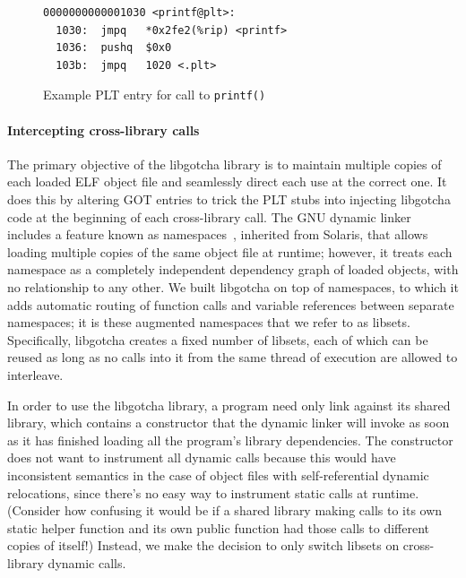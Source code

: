 \begin{figure}
\begin{verbatim}
0000000000001030 <printf@plt>:
  1030:  jmpq   *0x2fe2(%rip) <printf>
  1036:  pushq  $0x0
  103b:  jmpq   1020 <.plt>
\end{verbatim}
\caption{Example PLT entry for call to \texttt{printf()}}
\label{fig:plt}
\end{figure}

\paragraph{Intercepting cross-library calls}


The primary objective of the libgotcha library is to maintain multiple copies of each
loaded ELF object file and seamlessly direct each use at the correct one.  It does
this by altering GOT entries to trick the PLT stubs into injecting libgotcha code at
the beginning of each cross-library call.  The GNU
dynamic linker includes a feature known as namespaces~\cite{dlmopen-manpage},
inherited from Solaris, that allows loading multiple copies of the same object file
at runtime; however, it treats each namespace as a completely independent dependency
graph of loaded objects, with no relationship to any other.  We built
libgotcha on top of namespaces, to which it adds automatic routing of function calls
and variable references between separate namespaces; it is these augmented
namespaces that we refer to as libsets.  Specifically, libgotcha creates a fixed
number of
libsets, each of which can be reused as long as no calls into it from the same thread
of execution are allowed to interleave.

In order to use the libgotcha library, a program need only link against its shared
library, which contains a constructor that the dynamic linker will invoke as soon as
it has finished loading all the program's library dependencies.  The constructor
does not want to instrument all dynamic calls because this would
have inconsistent semantics in the case of object files with self-referential dynamic
relocations, since there's no easy way to instrument static calls at runtime.
(Consider how confusing it would be if a shared library making calls to its own
static helper function and its own public function had those calls to different
copies of itself!)  Instead, we make the decision to only switch libsets on
cross-library dynamic calls.

